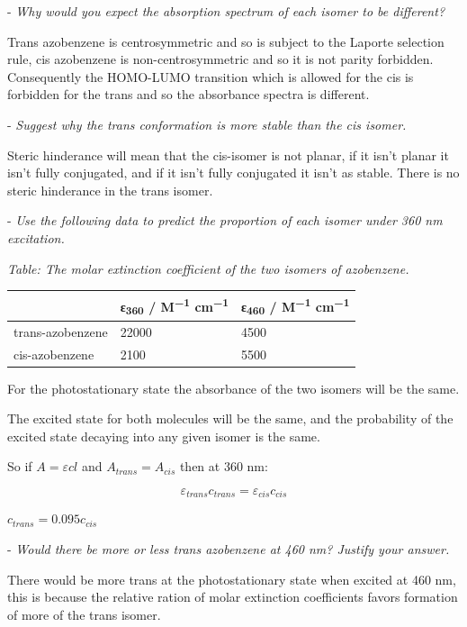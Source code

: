 \documentclass[
]{book}
\begin{document}
- \emph{Why would you expect the absorption spectrum of each isomer to be different?}

Trans azobenzene is centrosymmetric and so is subject to the Laporte selection rule, cis azobenzene is non-centrosymmetric and so it is not parity forbidden. Consequently the HOMO-LUMO transition which is allowed for the cis is forbidden for the trans and so the absorbance spectra is different.

- \emph{Suggest why the trans conformation is more stable than the cis isomer.}

Steric hinderance will mean that the cis-isomer is not planar, if it isn't planar it isn't fully conjugated, and if it isn't fully conjugated it isn't as stable. There is no steric hinderance in the trans isomer.

- \emph{Use the following data to predict the proportion of each isomer under 360 nm excitation.}

\emph{Table: \label{tab:azobenzeneabs} The molar extinction coefficient of the two isomers of azobenzene.}

\begin{longtable}[]{@{}lll@{}}
\toprule
& ε\textsubscript{360} / M\textsuperscript{−1} cm\textsuperscript{−1} & ε\textsubscript{460} / M\textsuperscript{−1} cm\textsuperscript{−1}\tabularnewline
\midrule
\endhead
trans-azobenzene & 22000 & 4500\tabularnewline
cis-azobenzene & 2100 & 5500\tabularnewline
\bottomrule
\end{longtable}

For the photostationary state the absorbance of the two isomers will be the same.

The excited state for both molecules will be the same, and the probability of the excited state decaying into any given isomer is the same.

So if \(A =\varepsilon cl\) and \(A_{trans}=A_{cis}\) then at 360 nm:

\begin{equation*}
\varepsilon_{trans} c_{trans} = \varepsilon_{cis} c_{cis}
\end{equation*}

\(c_{trans}= 0.095 c_{cis}\)

- \emph{Would there be more or less trans azobenzene at 460 nm? Justify your answer.}

There would be more trans at the photostationary state when excited at 460 nm, this is because the relative ration of molar extinction coefficients favors formation of more of the trans isomer.
\end{document}
